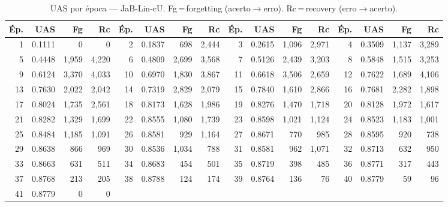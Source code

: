 \begin{table}[ht]
\centering\scriptsize
\caption{UAS por época --- JaB-Lin-cU. Fg\,=\,forgetting (acerto$\to$erro). Rc\,=\,recovery (erro$\to$acerto).}
\label{tab:uas-predictions-results-jabuticabert-linear}
\begin{tabular}{rrrr rrrr rrrr rrrr}
\toprule
\textbf{Ép.} & \textbf{UAS} & \textbf{Fg} & \textbf{Rc} & \textbf{Ép.} & \textbf{UAS} & \textbf{Fg} & \textbf{Rc} & \textbf{Ép.} & \textbf{UAS} & \textbf{Fg} & \textbf{Rc} & \textbf{Ép.} & \textbf{UAS} & \textbf{Fg} & \textbf{Rc} \\
\midrule
1 & 0.1111 & 0 & 0 & 2 & 0.1837 & 698 & 2,444 & 3 & 0.2615 & 1,096 & 2,971 & 4 & 0.3509 & 1,137 & 3,289 \\
5 & 0.4448 & 1,959 & 4,220 & 6 & 0.4809 & 2,699 & 3,568 & 7 & 0.5126 & 2,439 & 3,203 & 8 & 0.5848 & 1,515 & 3,253 \\
9 & 0.6124 & 3,370 & 4,033 & 10 & 0.6970 & 1,830 & 3,867 & 11 & 0.6618 & 3,506 & 2,659 & 12 & 0.7622 & 1,689 & 4,106 \\
13 & 0.7630 & 2,022 & 2,042 & 14 & 0.7319 & 2,829 & 2,079 & 15 & 0.7840 & 1,610 & 2,866 & 16 & 0.7681 & 2,282 & 1,898 \\
17 & 0.8024 & 1,735 & 2,561 & 18 & 0.8173 & 1,628 & 1,986 & 19 & 0.8276 & 1,470 & 1,718 & 20 & 0.8128 & 1,972 & 1,617 \\
21 & 0.8282 & 1,329 & 1,699 & 22 & 0.8555 & 1,080 & 1,739 & 23 & 0.8598 & 1,021 & 1,124 & 24 & 0.8523 & 1,183 & 1,001 \\
25 & 0.8484 & 1,185 & 1,091 & 26 & 0.8581 & 929 & 1,164 & 27 & 0.8671 & 770 & 985 & 28 & 0.8595 & 920 & 738 \\
29 & 0.8638 & 866 & 969 & 30 & 0.8536 & 1,034 & 788 & 31 & 0.8581 & 962 & 1,071 & 32 & 0.8713 & 632 & 950 \\
33 & 0.8663 & 631 & 511 & 34 & 0.8683 & 454 & 501 & 35 & 0.8719 & 398 & 485 & 36 & 0.8771 & 317 & 443 \\
37 & 0.8768 & 213 & 205 & 38 & 0.8788 & 124 & 174 & 39 & 0.8764 & 136 & 76 & 40 & 0.8779 & 59 & 96 \\
41 & 0.8779 & 0 & 0 &  & & &  &  & & &  &  & & &  \\
\bottomrule
\end{tabular}
\end{table}
